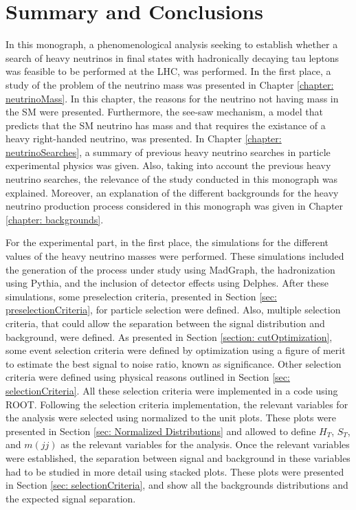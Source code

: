 \chapter{Summary and Conclusions}\label{chapter: conclusions}

In this monograph, a phenomenological analysis seeking to establish whether a search of heavy neutrinos in final states with hadronically decaying tau leptons was feasible to be performed at the LHC, was performed. In the first place, a study of the problem of the neutrino mass was presented in Chapter \ref{chapter: neutrinoMass}. In this chapter, the reasons for the neutrino not having mass in the SM were presented. Furthermore, the see-saw mechanism, a model that predicts that the SM neutrino has mass and that requires the existance of a heavy right-handed neutrino, was presented. In Chapter \ref{chapter: neutrinoSearches}, a summary of previous heavy neutrino searches in particle experimental physics was given. Also, taking into account the previous heavy neutrino searches, the relevance of the study conducted in this monograph was explained. Moreover, an explanation of the different backgrounds for the heavy neutrino production process considered in this monograph was given in Chapter \ref{chapter: backgrounds}.

For the experimental part, in the first place, the simulations for the different values of the heavy neutrino masses were performed. These simulations included the generation of the process under study using MadGraph, the hadronization using Pythia, and the inclusion of detector effects using Delphes. After these simulations, some preselection criteria, presented in Section \ref{sec: preselectionCriteria}, for particle selection were defined. Also, multiple selection criteria, that could allow the separation between the signal distribution and background, were defined. As presented in Section \ref{section: cutOptimization}, some event selection criteria were defined by optimization using a figure of merit to estimate the best signal to noise ratio, known as significance. Other selection criteria were defined using physical reasons outlined in Section \ref{sec: selectionCriteria}. All these selection criteria were implemented in a code using ROOT. Following the selection criteria implementation, the relevant variables for the analysis were selected using normalized to the unit plots. These plots were presented in Section \ref{sec: Normalized Distributions} and allowed to define $H_{T}$, $S_{T}$, and $m(jj)$ as the relevant variables for the analysis. Once the relevant variables were established, the separation between signal and background in these variables had to be studied in more detail using stacked plots. These plots were presented in Section \ref{sec: selectionCriteria}, and show all the backgrounds distributions and the expected signal separation.

